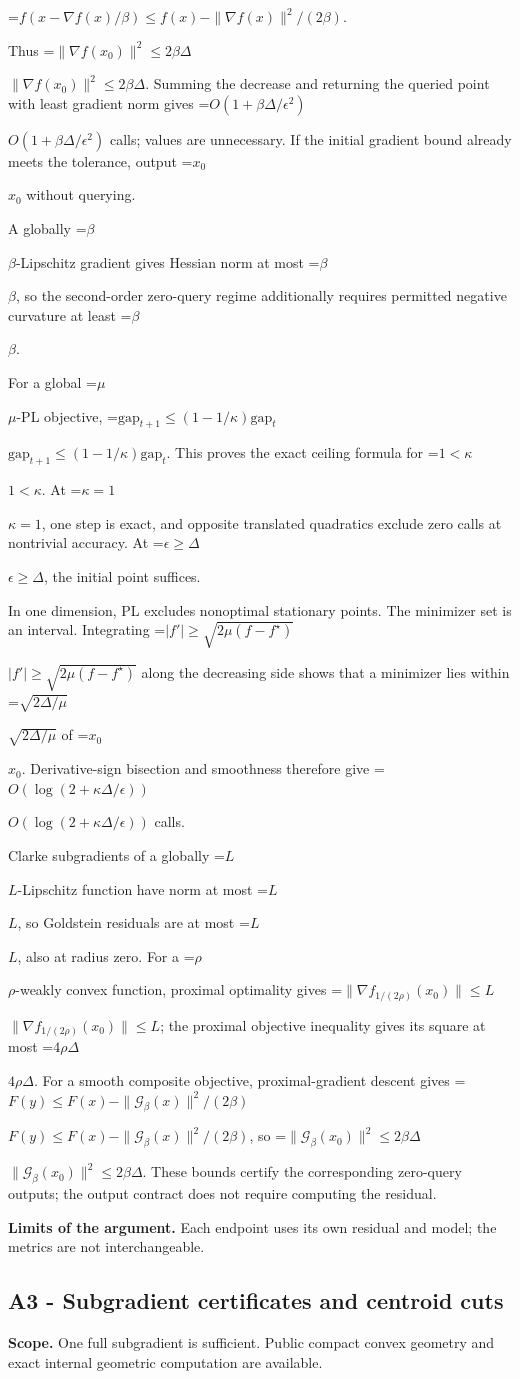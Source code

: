 \documentclass[10pt,a4paper]{article}
\newcommand{\AtlasMath}[1]{\par\begingroup\centering\setbox0=\hbox{$\displaystyle #1$}\ifdim\wd0>1.4\linewidth\typeout{ATLAS WIDE FORMULA: \the\wd0}\fi\ifdim\wd0>\linewidth\resizebox{\linewidth}{!}{\box0}\else\box0\fi\par\endgroup}
\newcommand{\AtlasInlineMath}[1]{\begingroup\setbox0=\hbox{$#1$}\ifdim\wd0>.4\linewidth\endgroup\AtlasMath{#1}\else\endgroup$#1$\fi}
\begin{document}
\AtlasMath{f(x-\nabla f(x)/\beta)\le f(x)-\|\nabla f(x)\|^2/(2\beta).}

Thus \AtlasInlineMath{\|\nabla f(x_0)\|^2\le2\beta\Delta}. Summing the decrease and returning the queried point with least gradient norm gives \AtlasInlineMath{O(1+\beta\Delta/\epsilon^2)} calls; values are unnecessary. If the initial gradient bound already meets the tolerance, output \AtlasInlineMath{x_0} without querying.

A globally \AtlasInlineMath{\beta}-Lipschitz gradient gives Hessian norm at most \AtlasInlineMath{\beta}, so the second-order zero-query regime additionally requires permitted negative curvature at least \AtlasInlineMath{\beta}.

For a global \AtlasInlineMath{\mu}-PL objective,
\AtlasInlineMath{\mathrm{gap}_{t+1}\le(1-1/\kappa)\mathrm{gap}_t}.
This proves the exact ceiling formula for \AtlasInlineMath{1<\kappa}. At \AtlasInlineMath{\kappa=1}, one step is exact, and opposite translated quadratics exclude zero calls at nontrivial accuracy. At \AtlasInlineMath{\epsilon\ge\Delta}, the initial point suffices.

In one dimension, PL excludes nonoptimal stationary points. The minimizer set is an interval. Integrating
\AtlasInlineMath{|f'|\ge\sqrt{2\mu(f-f^\star)}}
along the decreasing side shows that a minimizer lies within \AtlasInlineMath{\sqrt{2\Delta/\mu}} of \AtlasInlineMath{x_0}. Derivative-sign bisection and smoothness therefore give \AtlasInlineMath{O(\log(2+\kappa\Delta/\epsilon))} calls.

Clarke subgradients of a globally \AtlasInlineMath{L}-Lipschitz function have norm at most \AtlasInlineMath{L}, so Goldstein residuals are at most \AtlasInlineMath{L}, also at radius zero. For a \AtlasInlineMath{\rho}-weakly convex function, proximal optimality gives
\AtlasInlineMath{\|\nabla f_{1/(2\rho)}(x_0)\|\le L}; the proximal objective inequality gives its square at most \AtlasInlineMath{4\rho\Delta}.
For a smooth composite objective, proximal-gradient descent gives
\AtlasInlineMath{F(y)\le F(x)-\|\mathcal G_\beta(x)\|^2/(2\beta)},
so \AtlasInlineMath{\|\mathcal G_\beta(x_0)\|^2\le2\beta\Delta}.
These bounds certify the corresponding zero-query outputs; the output contract does not require computing the residual.

\textbf{Limits of the argument.} Each endpoint uses its own residual and model; the metrics are not interchangeable.

\subsection{A3 - Subgradient certificates and centroid cuts}
\textbf{Scope.} One full subgradient is sufficient. Public compact convex geometry and exact internal geometric computation are available.
\end{document}
